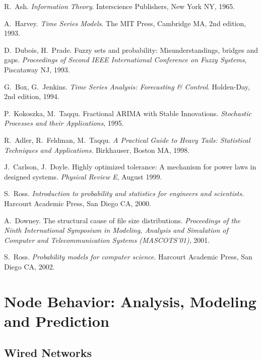 \documentclass{article}
\newcounter{myEnumCounter}
\newcounter{mySaveCounter}
\renewenvironment{enumerate}{%
  \begin{list}{[\arabic{myEnumCounter}]}{\usecounter{myEnumCounter}%
  \setcounter{myEnumCounter}{\value{mySaveCounter}}}
  }{%
  \setcounter{mySaveCounter}{\value{myEnumCounter}}\end{list}%
}
\begin{document}
\begin{enumerate}

R.~Ash. \textit{Information Theory}. Interscience Publishers, New York NY, 1965.

A.~Harvey.
\textit{Time Series Models}.
The MIT Press, Cambridge MA, 2nd edition, 1993.

D.~Dubois, H.~Prade.
Fuzzy sets and probability: Misunderstandings, bridges and gaps.
\textit{Proceedings of Second IEEE International Conference on Fuzzy Systems}, Piscataway NJ, 1993.

G.~Box, G.~Jenkins.
\textit{Time Series Analysis: Forecasting \& Control}.
Holden-Day, 2nd edition, 1994.

P.~Kokoszka, M.~Taqqu.
Fractional ARIMA with Stable Innovations.
\textit{Stochastic Processes and their Applications}, 1995.

R.~Adler, R.~Feldman, M.~Taqqu.
\textit{A Practical Guide to Heavy Tails: Statistical Techniques and Applications}.
Birkhauser, Boston MA, 1998.

J.~Carlson, J.~Doyle. Highly optimized tolerance: A mechanism for power laws in designed systems.
\textit{Physical Review E}, August 1999.

S.~Ross.
\textit{Introduction to probability and statistics for engineers and scientists}.
Harcourt Academic Press, San Diego CA, 2000.

A.~Downey.
The structural cause of file size distributions.
\textit{Proceedings of the Ninth International Symposium in Modeling, Analysis and Simulation of Computer and Telecommunication Systems (MASCOTS’01)}, 2001.

S.~Ross.
\textit{Probability models for computer science}.
Harcourt Academic Press, San Diego CA, 2002.

\end{enumerate}

\section{Node Behavior: Analysis, Modeling and Prediction}

\subsection{Wired Networks}
\end{document}
